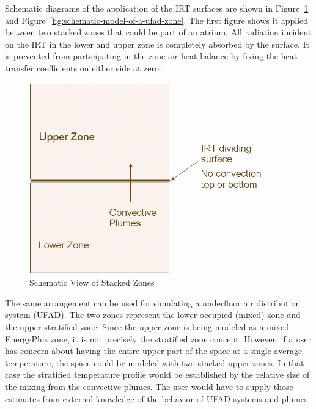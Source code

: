 Schematic diagrams of the application of the IRT surfaces are shown in Figure~\ref{fig:schematic-view-of-stacked-zones} and Figure~\ref{fig:schematic-model-of-a-ufad-zone}. The first figure shows it applied between two stacked zones that could be part of an atrium. All radiation incident on the IRT in the lower and upper zone is completely absorbed by the surface. It is prevented from participating in the zone air heat balance by fixing the heat transfer coefficients on either side at zero.

\begin{figure}[hbtp] %
\centering
\includegraphics[width=0.9\textwidth, height=0.9\textheight, keepaspectratio=true]{media/image390.png}
\caption{Schematic View of Stacked Zones \protect \label{fig:schematic-view-of-stacked-zones}}
\end{figure}

The same arrangement can be used for simulating a underfloor air distribution system (UFAD). The two zones represent the lower occupied (mixed) zone and the upper stratified zone. Since the upper zone is being modeled as a mixed EnergyPlus zone, it is not precisely the stratified zone concept. However, if a user has concern about having the entire upper part of the space at a single average temperature, the space could be modeled with two stacked upper zones. In that case the stratified temperature profile would be established by the relative size of the mixing from the convective plumes. The user would have to supply those estimates from external knowledge of the behavior of UFAD systems and plumes.

